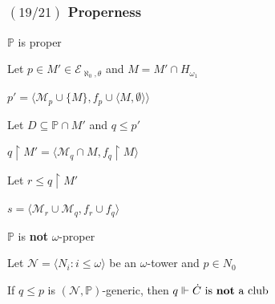\documentclass{beamer}
\newcommand{\p}{\mathds{P}}
\newcommand{\op}[2]{\langle #1, #2 \rangle}
\newcommand{\res}[2]{#1{\restriction}#2}
\newcommand{\el}[1]{\mathcal{E}_{\aleph_0, #1}}
\begin{document}
\begin{frame}
\frametitle{$(19/21)$ \hspace{20mm} Properness }
\begin{theorem}
$\p$ is proper
\end{theorem}
\begin{alertblock}{}
Let $p \in M' \in \el{\theta}$ and $M=M' \cap H_{\omega_1}$

$p'=\op{\mathcal{M}_p \cup \lbrace M \rbrace}{f_p \cup \op{M}{\emptyset}}$

Let $D \subseteq \p \cap M'$ and $q \leq p'$

$\res{q}{M'}=\op{\mathcal{M}_q\cap M}{\res{f_q}{M}}$

Let $r \leq \res{q}{M'}$

$s = \op{\mathcal{M}_r \cup \mathcal{M}_q}{f_r \cup f_q}$
\end{alertblock}
\pause
\begin{theorem}
$\p$ is \textbf{not} $\omega$-proper
\end{theorem}
\begin{alertblock}{}
Let $\mathcal{N}=\langle N_i \colon i \leq \omega \rangle$ be an $\omega$-tower and $p \in N_0$

If $ q \leq p$ is $(\mathcal{N}, \p)$-generic, then $q \Vdash \dot{C} \text{ is \textbf{not} a club}$
\end{alertblock}
\end{frame}
\end{document}
